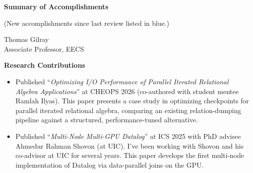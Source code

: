 \documentclass[line]{res}
\begin{document}
\centering
\textbf{Summary of Accomplishments}
\vspace{-0.5cm}
\begin{center}
\footnotesize{(New accomplishments since last review listed in blue.)}
\end{center}

\vspace{-0.25cm}
Thomas Gilray \\
Associate Professor, EECS
\vspace{0.25cm}


\textbf{Research Contributions}

\begin{mycolorbox}
\begin{itemize}
\item Published ``\textit{Optimizing I/O Performance of Parallel Iterated Relational Algebra Applications}'' at CHEOPS 2026 (co-authored with student mentee Ramlah Ilyas). This paper presents a case study in optimizing checkpoints for parallel iterated relational algebra, comparing an existing relation-dumping pipeline against a structured, performance-tuned alternative.

\item Published ``\emph{Multi-Node Multi-GPU Datalog}'' at ICS 2025 with PhD advisee Ahmedur Rahman Shovon (at UIC). I've been working with Shovon and his co-advisor at UIC for several years. This paper develops the first multi-node implementation of Datalog via data-parallel joins on the GPU.
\end{itemize}
\end{mycolorbox}
\end{document}
